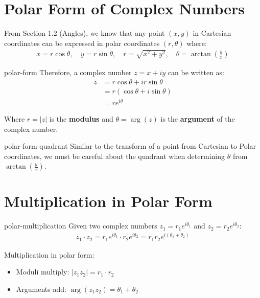 \documentclass[12pt]{article}
\begin{document}
\section{Polar Form of Complex Numbers}

From Section 1.2 (Angles), we know that any point $(x, y)$ in Cartesian coordinates can be expressed in polar coordinates $(r, \theta)$ where:
\begin{align}
x = r\cos\theta, \quad y = r\sin\theta, \quad r = \sqrt{x^2 + y^2}, \quad \theta = \arctan\left(\frac{y}{x}\right)
\end{align}

\begin{dfn}{polar-form}
Therefore, a complex number $z = x + iy$ can be written as:
\begin{align}
z &= r\cos\theta + ir\sin\theta \nonumber \\
&= r(\cos\theta + i\sin\theta) \nonumber \\
&= re^{i\theta}
\end{align}

Where $r = |z|$ is the \textbf{modulus} and $\theta = \arg(z)$ is the \textbf{argument} of the complex number. 
\end{dfn}

\begin{rem}{polar-form-quadrant}
Similar to the transform of a point from Cartesian to Polar coordinates, we must be careful about the quadrant when determining $\theta$ from $\arctan\left(\frac{y}{x}\right)$. 
\end{rem}

\section{Multiplication in Polar Form}

\begin{prop}{polar-multiplication}
Given two complex numbers $z_1 = r_1 e^{i\theta_1}$ and $z_2 = r_2 e^{i\theta_2}$:
\begin{align}
z_1 \cdot z_2 = r_1 e^{i\theta_1} \cdot r_2 e^{i\theta_2} = r_1 r_2 e^{i(\theta_1 + \theta_2)}
\end{align}

Multiplication in polar form:
\begin{itemize}
    \item Moduli multiply: $|z_1 z_2| = r_1 \cdot r_2$
    \item Arguments add: $\arg(z_1 z_2) = \theta_1 + \theta_2$
\end{itemize}
\end{prop}
\end{document}
